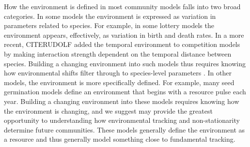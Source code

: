 \documentclass[11pt,letterpaper]{article}
\begin{document}
How the environment is defined in most community models falls into two broad categories. In some models the environment is expressed as variation in parameters related to species. For example, in some lottery models the environment appears, effectively, as variation in birth and death rates. In a more recent, CITERUDOLF added the temporal environment to competition models by making interaction strength dependent on the temporal distance between species. Building a changing environment into such models thus requires knowing how environmental shifts filter through to species-level parameters \citep{Tuljapurkar2009}.  In other models, the environment is more specifically defined. For example, many seed germination models define an environment that begins with a resource pulse each year. Building a changing environment into these models requires knowing how the environment is changing, and we suggest may provide the greatest opportunity to understanding how environmental tracking and non-stationarity determine future communities. These models generally define the environment as a resource and thus generally model something close to fundamental tracking. %

\end{document}
